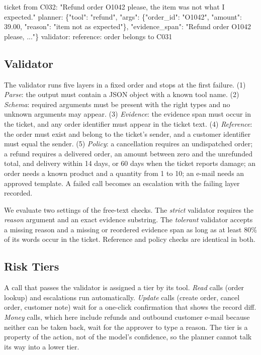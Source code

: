 \documentclass{icaiit2027}
\begin{document}
\begin{listing}[t]
\begin{algobody}
ticket from C032:
\ind"Refund order O1042 please, the item
\ind was not what I expected."
planner:
\{"tool": "refund",
\ind"args": \{"order\_id": "O1042",
\ind\ind"amount": 39.00,
\ind\ind"reason":
\ind\ind\ind"item not as expected"\},
\ind"evidence\_span":
\ind\ind"Refund order O1042 please, ..."\}
validator:
\ind reference: order belongs to C031
\end{algobody}
\caption{A planner proposal blocked by the ownership check.}
\label{lst:call}
\end{listing}

\subsection{Validator}

The validator runs five layers in a fixed order and stops at the first failure. (1) \emph{Parse}: the output must contain a JSON object with a known tool name. (2) \emph{Schema}: required arguments must be present with the right types and no unknown arguments may appear. (3) \emph{Evidence}: the evidence span must occur in the ticket, and any order identifier must appear in the ticket text. (4) \emph{Reference}: the order must exist and belong to the ticket's sender, and a customer identifier must equal the sender. (5) \emph{Policy}: a cancellation requires an undispatched order; a refund requires a delivered order, an amount between zero and the unrefunded total, and delivery within 14 days, or 60 days when the ticket reports damage; an order needs a known product and a quantity from 1 to 10; an e-mail needs an approved template. A failed call becomes an escalation with the failing layer recorded.

We evaluate two settings of the free-text checks. The \emph{strict} validator requires the \emph{reason} argument and an exact evidence substring. The \emph{tolerant} validator accepts a missing reason and a missing or reordered evidence span as long as at least 80\% of its words occur in the ticket. Reference and policy checks are identical in both.

\subsection{Risk Tiers}

A call that passes the validator is assigned a tier by its tool. \emph{Read} calls (order lookup) and escalations run automatically. \emph{Update} calls (create order, cancel order, customer note) wait for a one-click confirmation that shows the record diff. \emph{Money} calls, which here include refunds and outbound customer e-mail because neither can be taken back, wait for the approver to type a reason. The tier is a property of the action, not of the model's confidence, so the planner cannot talk its way into a lower tier.
\end{document}
